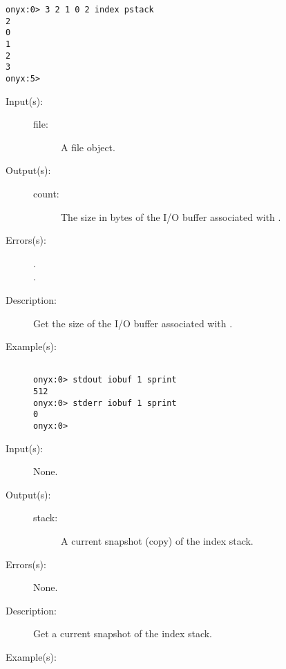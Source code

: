 \begin{description}
\begin{description}
\begin{verbatim}
onyx:0> 3 2 1 0 2 index pstack
2
0
1
2
3
onyx:5>
		\end{verbatim}
	\end{description}
\label{systemdict:iobuf}
\item[{\onyxop{file}{iobuf}{count}}: ]
	\begin{description}\item[]
	\item[Input(s): ]
		\begin{description}\item[]
		\item[file: ]
			A file object.
		\end{description}
	\item[Output(s): ]
		\begin{description}\item[]
		\item[count: ]
			The size in bytes of the I/O buffer associated with
			.
		\end{description}
	\item[Errors(s): ]
		\begin{description}\item[]
		\item[.]
		\item[.]
		\end{description}
	\item[Description: ]
		Get the size of the I/O buffer associated with .
	\item[Example(s): ]\begin{verbatim}

onyx:0> stdout iobuf 1 sprint
512
onyx:0> stderr iobuf 1 sprint
0
onyx:0>
		\end{verbatim}
	\end{description}
\label{systemdict:istack}
\item[{\onyxop{--}{istack}{stack}}: ]
	\begin{description}\item[]
	\item[Input(s): ] None.
	\item[Output(s): ]
		\begin{description}\item[]
		\item[stack: ]
			A current snapshot (copy) of the index stack.
		\end{description}
	\item[Errors(s): ] None.
	\item[Description: ]
		Get a current snapshot of the index stack.
	\item[Example(s): ]\begin{verbatim}


\end{verbatim}
\end{description}
\end{description}
